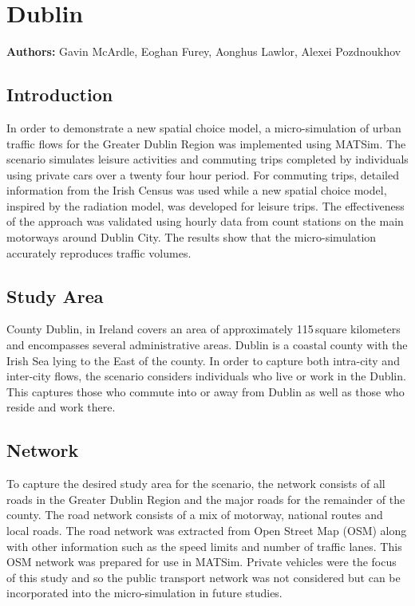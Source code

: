 \section{Dublin}
\label{sec:dublin}
\hfill \textbf{Authors:} Gavin McArdle, Eoghan Furey, Aonghus Lawlor, Alexei Pozdnoukhov

\subsection{Introduction}
In order to demonstrate a new spatial choice model, a micro-simulation of urban traffic flows for the Greater Dublin Region was implemented using MATSim. The scenario simulates leisure activities and commuting trips completed by individuals using private cars over a twenty four hour period. For commuting trips, detailed information from the Irish Census was used while a new spatial choice model, inspired by the radiation model, was developed for leisure trips. The effectiveness of the approach was validated using hourly data from count stations on the main motorways around Dublin City. The results show that the micro-simulation accurately reproduces traffic volumes.

\subsection{Study Area}
County Dublin, in Ireland covers an area of approximately 115\,square kilometers and encompasses several administrative areas. Dublin is a coastal county with the Irish Sea lying to the East of the county. In order to capture both intra-city and inter-city flows, the scenario considers individuals who live or work in the Dublin. This captures those who commute into or away from Dublin as well as those who reside and work there.

\subsection{Network}
To capture the desired study area for the scenario, the network consists of all roads in the Greater Dublin Region and the major roads for the remainder of the county. The road network consists of a mix of motorway, national routes and local roads. The road network was extracted from Open Street Map (OSM) along with other information such as the speed limits and number of traffic lanes. This OSM network was prepared for use in MATSim. Private vehicles were the focus of this study and so the public transport network was not considered but can be incorporated into the micro-simulation in future studies.

